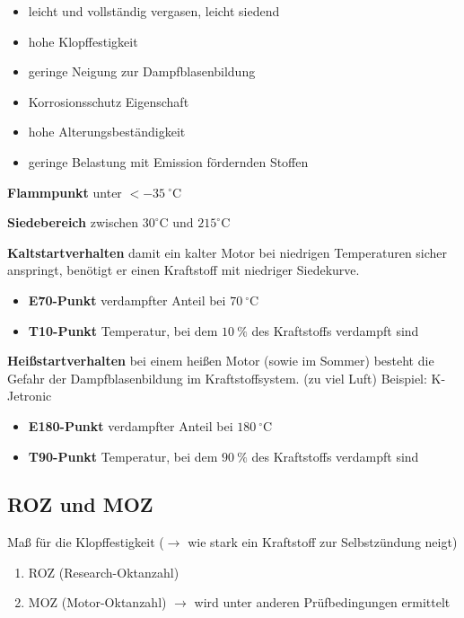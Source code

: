\begin{itemize}
\item
  leicht und vollständig vergasen, leicht siedend
\item
  hohe Klopffestigkeit
\item
  geringe Neigung zur Dampfblasenbildung
\item
  Korrosionsschutz Eigenschaft
\item
  hohe Alterungsbeständigkeit
\item
  geringe Belastung mit Emission fördernden Stoffen
\end{itemize}

\textbf{Flammpunkt} unter $<-35~^\circ\text{C}$

\textbf{Siedebereich} zwischen
$30^\circ\text{C} \text{ und } 215^\circ\text{C}$

\textbf{Kaltstartverhalten} damit ein kalter Motor bei niedrigen
Temperaturen sicher anspringt, benötigt er einen Kraftstoff mit
niedriger Siedekurve.

\begin{itemize}
\item
  \textbf{E70-Punkt} verdampfter Anteil bei $70~^\circ\text{C}$
\item
  \textbf{T10-Punkt} Temperatur, bei dem $10~\%$ des Kraftstoffs
  verdampft sind
\end{itemize}

\textbf{Heißstartverhalten} bei einem heißen Motor (sowie im Sommer)
besteht die Gefahr der Dampfblasenbildung im Kraftstoffsystem. (zu viel
Luft) Beispiel: K-Jetronic

\begin{itemize}
\item
  \textbf{E180-Punkt} verdampfter Anteil bei $180~^\circ\text{C}$
\item
  \textbf{T90-Punkt} Temperatur, bei dem $90~\%$ des Kraftstoffs
  verdampft sind
\end{itemize}

\subsection{ROZ und MOZ}\label{roz-und-moz}

Maß für die Klopffestigkeit ($\to$ wie stark ein Kraftstoff zur
Selbstzündung neigt)

\begin{enumerate}
\item
  ROZ (Research-Oktanzahl)
\item
  MOZ (Motor-Oktanzahl) $\to$ wird unter anderen Prüfbedingungen
  ermittelt
\end{enumerate}

